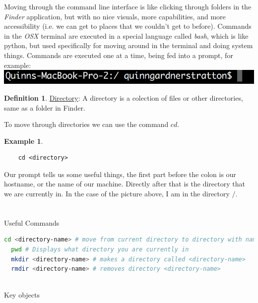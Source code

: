 \documentclass{article}
\numberwithin{pic}{section}
\numberwithin{lem}{section}
\numberwithin{thm}{section}
\numberwithin{cor}{section}
\theoremstyle{definition}
\newtheorem{ex}{Example}
\numberwithin{ex}{section}
\newtheorem{defn}{Definition}
\theoremstyle{definition}
\theoremstyle{remark}
\begin{document}
\pagestyle{fancy}

\tableofcontents

Moving through the command line interface is like clicking through folders in the \textit{Finder} application, but with no nice visuals, more capabilities, and more accessibility (i.e. we can get to places that we couldn't get to before). Commands in the \textit{OSX} terminal are executed in a special language called \textit{bash}, which is like python, but used specifically for moving around in the terminal and doing system things. Commands are executed one at a time, being fed into a prompt, for example:\\
\includegraphics{prompt-ex}\\
\begin{defn}
  \underline{Directory}: A directory is a colection of files or other directories, same as a folder in Finder. 
\end{defn}
To move through directories we can use the command $cd$.
\begin{ex}
  \begin{lstlisting}
    cd <directory>
  \end{lstlisting}
\end{ex}
Our prompt tells us some useful things, the first part before the colon is our hostname, or the name of our machine. Directly after that is the directory that we are currently in. In the case of the picture above, I am in the directory $/$.\\\\\\

Useful Commands
\begin{lstlisting}[frame=single,language=bash,basicstyle=\footnotesize, keywordstyle=\color{blue}, commentstyle=\color{violet}]
  cd <directory-name> # move from current directory to directory with name <directoryname>
  pwd # Displays what directory you are currently in
  mkdir <directory-name> # makes a directory called <directory-name>
  rmdir <directory-name> # removes directory <directory-name>
  
\end{lstlisting}

Key objects
\begin{lstlisting}[frame=single,language=bash,basicstyle=\footnotesize, keywordstyle=\color{blue}, commentstyle=\color{violet}]
  
\end{lstlisting}
\end{document}

